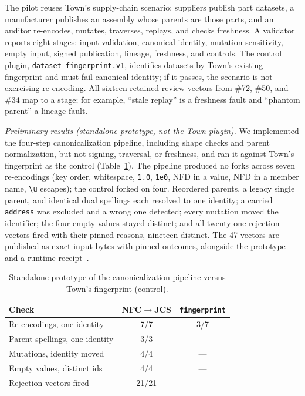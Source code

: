 \documentclass[conference]{IEEEtran}
\begin{document}
The pilot reuses Town's supply-chain scenario: suppliers publish part datasets, a manufacturer publishes an assembly whose parents are those parts, and an auditor re-encodes, mutates, traverses, replays, and checks freshness. A validator reports eight stages: input validation, canonical identity, mutation sensitivity, empty input, signed publication, lineage, freshness, and controls. The control plugin, \texttt{dataset-fingerprint.v1}, identifies datasets by Town's existing fingerprint and must fail canonical identity; if it passes, the scenario is not exercising re-encoding. All sixteen retained review vectors from \#72, \#50, and \#34 map to a stage; for example, ``stale replay'' is a freshness fault and ``phantom parent'' a lineage fault.

\emph{Preliminary results (standalone prototype, not the Town plugin).} We implemented the four-step canonicalization pipeline, including shape checks and parent normalization, but not signing, traversal, or freshness, and ran it against Town's fingerprint as the control (Table~\ref{tab:proto}). The pipeline produced no forks across seven re-encodings (key order, whitespace, \texttt{1.0}, \texttt{1e0}, NFD in a value, NFD in a member name, \verb|\u| escapes); the control forked on four. Reordered parents, a legacy single parent, and identical dual spellings each resolved to one identity; a carried \texttt{address} was excluded and a wrong one detected; every mutation moved the identifier; the four empty values stayed distinct; and all twenty-one rejection vectors fired with their pinned reasons, nineteen distinct. The 47 vectors are published as exact input bytes with pinned outcomes, alongside the prototype and a runtime receipt~\cite{artifact}.

\begin{table}[t]
\caption{Standalone prototype of the canonicalization pipeline versus Town's fingerprint (control).}
\label{tab:proto}
\centering\small
\setlength{\tabcolsep}{4pt}
\begin{tabular}{l|c|c}
\hline
Check & NFC$\rightarrow$JCS & \texttt{fingerprint}\\
\hline
Re-encodings, one identity & 7/7 & 3/7\\
Parent spellings, one identity & 3/3 & ---\\
Mutations, identity moved & 4/4 & ---\\
Empty values, distinct ids & 4/4 & ---\\
Rejection vectors fired & 21/21 & ---\\
\hline
\end{tabular}
\end{table}
\end{document}
